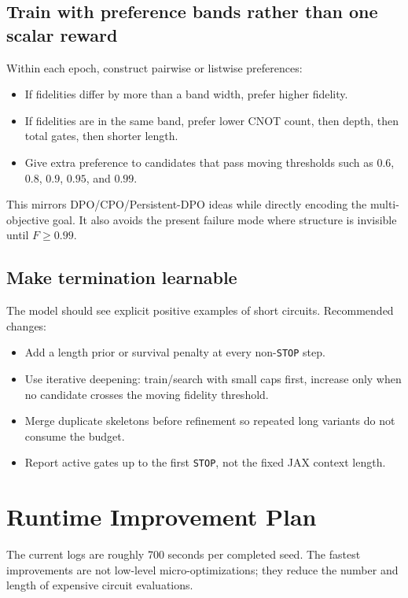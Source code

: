 \documentclass[11pt]{article}
\begin{document}
\subsection{Train with preference bands rather than one scalar reward}

Within each epoch, construct pairwise or listwise preferences:
\begin{itemize}
  \item If fidelities differ by more than a band width, prefer higher fidelity.
  \item If fidelities are in the same band, prefer lower CNOT count, then depth,
  then total gates, then shorter length.
  \item Give extra preference to candidates that pass moving thresholds such as
  \(0.6\), \(0.8\), \(0.9\), \(0.95\), and \(0.99\).
\end{itemize}

This mirrors DPO/CPO/Persistent-DPO ideas while directly encoding the
multi-objective goal.  It also avoids the present failure mode where structure
is invisible until \(F\ge 0.99\).

\subsection{Make termination learnable}

The model should see explicit positive examples of short circuits.  Recommended
changes:
\begin{itemize}
  \item Add a length prior or survival penalty at every non-\texttt{STOP} step.
  \item Use iterative deepening: train/search with small caps first, increase
  only when no candidate crosses the moving fidelity threshold.
  \item Merge duplicate skeletons before refinement so repeated long variants do
  not consume the budget.
  \item Report active gates up to the first \texttt{STOP}, not the fixed JAX
  context length.
\end{itemize}

\section{Runtime Improvement Plan}

The current logs are roughly 700 seconds per completed seed.  The fastest
improvements are not low-level micro-optimizations; they reduce the number and
length of expensive circuit evaluations.
\end{document}
